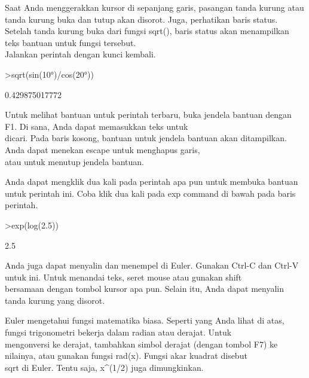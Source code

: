 \documentclass{article}
\begin{document}
\begin{eulernotebook}
\begin{eulercomment}
Saat Anda menggerakkan kursor di sepanjang garis, pasangan tanda
kurung atau tanda kurung buka dan tutup akan disorot. Juga, perhatikan
baris status. Setelah tanda kurung buka dari fungsi sqrt(), baris
status akan menampilkan teks bantuan untuk fungsi tersebut.\\
Jalankan perintah dengan kunci kembali.
\end{eulercomment}
\begin{eulerprompt}
>sqrt(sin(10°)/cos(20°))
\end{eulerprompt}
\begin{euleroutput}
  0.429875017772
\end{euleroutput}
\begin{eulercomment}
Untuk melihat bantuan untuk perintah terbaru, buka jendela bantuan
dengan F1. Di sana, Anda dapat memasukkan teks untuk\\
dicari. Pada baris kosong, bantuan untuk jendela bantuan akan
ditampilkan. Anda dapat menekan escape untuk menghapus garis,\\
atau untuk menutup jendela bantuan.

Anda dapat mengklik dua kali pada perintah apa pun untuk membuka
bantuan untuk perintah ini. Coba klik dua kali pada exp command di
bawah pada baris perintah.
\end{eulercomment}
\begin{eulerprompt}
>exp(log(2.5))
\end{eulerprompt}
\begin{euleroutput}
  2.5
\end{euleroutput}
\begin{eulercomment}
Anda juga dapat menyalin dan menempel di Euler. Gunakan Ctrl-C dan
Ctrl-V untuk ini. Untuk menandai teks, seret mouse atau gunakan shift\\
bersamaan dengan tombol kursor apa pun. Selain itu, Anda dapat
menyalin tanda kurung yang disorot.
\end{eulercomment}
\begin{eulercomment}

\end{eulercomment}
\begin{eulercomment}
Euler mengetahui fungsi matematika biasa. Seperti yang Anda lihat di
atas, fungsi trigonometri bekerja dalam radian atau derajat. Untuk\\
mengonversi ke derajat, tambahkan simbol derajat (dengan tombol F7) ke
nilainya, atau gunakan fungsi rad(x). Fungsi akar kuadrat disebut\\
sqrt di Euler. Tentu saja, x\textasciicircum{}(1/2) juga dimungkinkan.


\end{eulercomment}
\end{eulernotebook}
\end{document}

